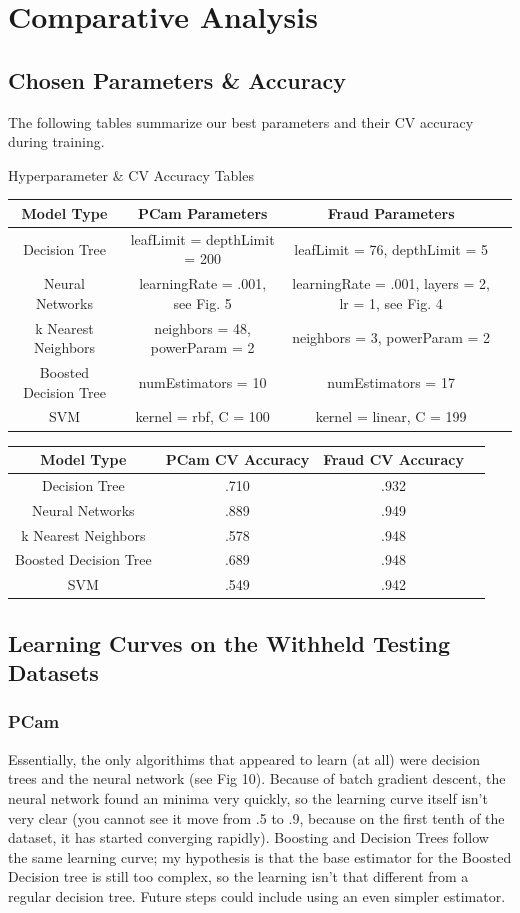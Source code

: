 \documentclass[a4paper]{article}
\begin{document}
\section{Comparative Analysis}
\subsection{Chosen Parameters \& Accuracy}
The following tables summarize our best parameters and their CV accuracy during training.
\begin{center}
Hyperparameter \& CV Accuracy Tables
\begin{tabular}{ |c|c|c|c| } 
\hline
Model Type & PCam Parameters & Fraud Parameters \\
\hline
Decision Tree & leafLimit = depthLimit = 200 & leafLimit = 76, depthLimit = 5\\ 
Neural Networks & learningRate = .001, see Fig. 5 & learningRate = .001, layers = 2, lr = 1, see Fig. 4\\ 
k Nearest Neighbors & neighbors = 48, powerParam = 2 & neighbors = 3, powerParam = 2\\ 
Boosted Decision Tree & numEstimators = 10 & numEstimators = 17\\ 
SVM & kernel = rbf, C = 100 & kernel = linear, C = 199\\ 
\hline
\end{tabular}
\end{center}

\begin{center}
\begin{tabular}{ |c|c|c|c| } 
\hline
Model Type & PCam CV Accuracy & Fraud CV Accuracy \\
\hline
Decision Tree & .710 & .932 \\ 
Neural Networks & .889 & .949 \\ 
k Nearest Neighbors & .578 & .948 \\ 
Boosted Decision Tree & .689 & .948 \\ 
SVM & .549 & .942 \\ 
\hline
\end{tabular}
\end{center}
\subsection{Learning Curves on the Withheld Testing Datasets}
\subsubsection{PCam}
Essentially, the only algorithims that appeared to learn (at all) were decision trees and the neural network (see Fig 10). Because of batch gradient descent, the neural network found an minima very quickly, so the learning curve itself isn't very clear (you cannot see it move from .5 to .9, because on the first tenth of the dataset, it has started converging rapidly). Boosting and Decision Trees follow the same learning curve; my hypothesis is that the base estimator for the Boosted Decision tree is still too complex, so the learning isn't that different from a regular decision tree. Future steps could include using an even simpler estimator.
\end{document}
